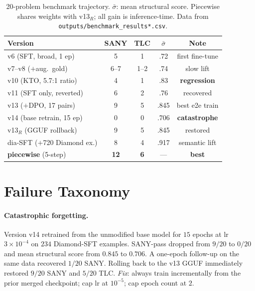 \documentclass[10pt,twocolumn]{article}
\begin{document}
\begin{table}[t]
\centering
\small
\setlength{\tabcolsep}{6pt}
\begin{tabular}{@{}lcccc@{}}
\toprule
Version & SANY & TLC & $\bar\sigma$ & Note \\
\midrule
v6 (SFT, broad, 1 ep)         & 5  & 1 & .72 & first fine-tune \\
v7--v8 ($+$aug.\ gold)        & 6--7 & 1--2 & .74 & slow lift \\
v10 (KTO, 5.7:1 ratio)        & 4  & 1 & .83 & \textbf{regression} \\
v11 (SFT only, reverted)      & 6  & 2 & .76 & recovered \\
v13 ($+$DPO, 17 pairs)        & 9  & 5 & .845 & best e2e train \\
\midrule
v14 (base retrain, 15 ep)     & 0  & 0 & .706 & \textbf{catastrophe} \\
v13$_R$ (GGUF rollback)       & 9  & 5 & .845 & restored \\
\midrule
dia-SFT ($+$720 Diamond ex.)  & 8  & 4 & .917 & semantic lift \\
\textbf{piecewise} (5-step)   & \textbf{12} & \textbf{6} & — & \textbf{best} \\
\bottomrule
\end{tabular}
\caption{20-problem benchmark trajectory.
$\bar\sigma$: mean structural score.
Piecewise shares weights with v13$_R$; all gain is inference-time.
Data from \texttt{outputs/benchmark\_results*.csv}.}
\label{tab:trajectory}
\end{table}

\section{Failure Taxonomy}
\label{sec:failures}

\paragraph{Catastrophic forgetting.}
Version v14 retrained from the unmodified base model for $15$ epochs at
lr $3\!\times\!10^{-4}$ on $234$ Diamond-SFT examples.
SANY-pass dropped from $9/20$ to $0/20$ and mean structural score from
$0.845$ to $0.706$.
A one-epoch follow-up on the same data recovered $1/20$ SANY.
Rolling back to the v13 GGUF immediately restored $9/20$ SANY and $5/20$ TLC.
\textit{Fix}: always train incrementally from the prior merged checkpoint;
cap lr at $10^{-5}$; cap epoch count at $2$.
\end{document}
